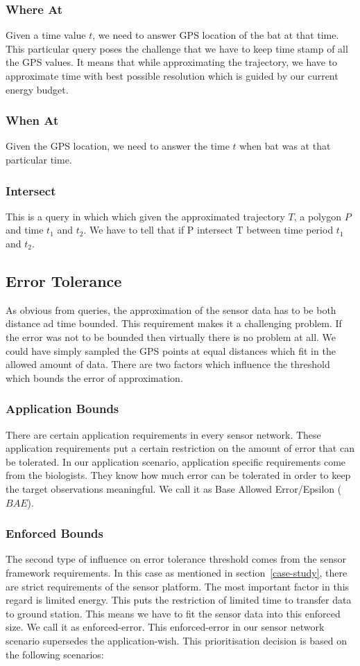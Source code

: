\documentclass[conference]{IEEEtran}
\begin{document}
\subsubsection{Where At}
Given a time value $t$, we need to answer GPS location of the bat at that time. This particular 
query poses the challenge that we have to keep time stamp of all the GPS values. It means that while 
approximating the trajectory, we have to approximate time with best possible resolution which is guided 
by our current energy budget.
\subsubsection{When At}
Given the GPS location, we need to answer the time $t$ when bat was at that particular time. 
\subsubsection{Intersect}
This is a query in which which given the approximated trajectory $T$, a polygon $P$ and time $t_1$ and 
$t_2$. We have to tell that if P intersect T between time period $t_1$ and $t_2$.
\subsection{Error Tolerance}
As obvious from queries, the approximation of the sensor data has to be both distance ad time bounded. 
This requirement makes it a challenging problem. If the error was not to be bounded then virtually 
there is no problem at all. We could have simply sampled the GPS points at equal distances which fit 
in the allowed amount of data. There are two factors which influence the threshold which bounds the error 
of approximation.\

\subsubsection{Application Bounds}
There are certain application requirements in every sensor network. These application requirements 
put a certain restriction on the amount of error that can be tolerated. In our application scenario, 
application specific requirements come from the biologists. They know how much error can be tolerated 
in order to keep the target observations meaningful. We call it as Base Allowed Error/Epsilon ($BAE$).

\subsubsection{Enforced Bounds}
The second type of influence on error tolerance threshold comes from the sensor framework requirements. 
In this case as mentioned in section~\ref{case-study}, there are strict requirements of the sensor platform. 
The most important factor in this regard is limited energy. This puts the restriction of limited time to 
transfer data to ground station. This means we have to fit the sensor data into this enforced size. We 
call it as enforced-error. This enforced-error in our sensor network scenario supersedes the application-wish. 
This prioritisation decision is based on the following scenarios:
\end{document}
